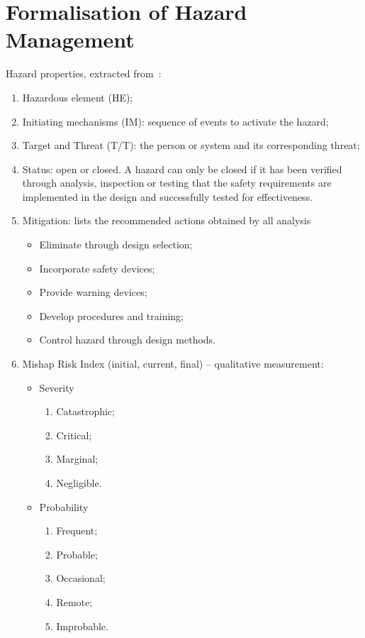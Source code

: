 \chapter{Formalisation of Hazard Management}

Hazard properties, extracted from~\cite{EricsonII2005}:
%
\begin{enumerate}
  \item Hazardous element (HE);
  \item Initiating mechanisms (IM): sequence of events to activate the hazard;
  \item Target and Threat (T/T): the person or system and its corresponding threat;
  \item Status: open or closed. A hazard can only be closed if it has been verified through analysis, inspection or testing that the safety requirements are implemented in the design and successfully tested for effectiveness.
  \item Mitigation: lists the recommended actions obtained by all analysis
  \begin{itemize}
    \item Eliminate through design selection;
    \item Incorporate safety devices;
    \item Provide warning devices;
    \item Develop procedures and training;
    \item Control hazard through design methods.
  \end{itemize}
  \item Mishap Risk Index (initial, current, final) -- qualitative measurement:
  \begin{itemize}
    \item Severity
    \begin{enumerate}
      \item Catastrophic;
      \item Critical;
      \item Marginal;
      \item Negligible.
    \end{enumerate}
    \item Probability
    \begin{enumerate}
      \item Frequent;
      \item Probable;
      \item Occasional;
      \item Remote;
      \item Improbable.
    \end{enumerate}
  \end{itemize} 
\end{enumerate}

